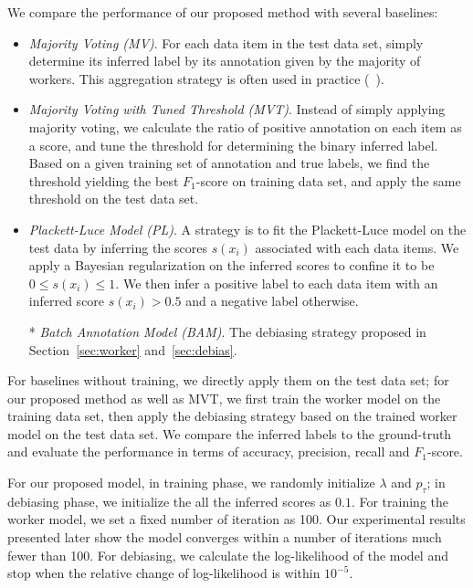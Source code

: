 We compare the performance of our proposed method with several baselines:
\begin{itemize}
  \item \emph{Majority Voting (MV)}.
        For each data item in the test data set, 
        simply determine its inferred label by its annotation given by the majority of workers.  
        This aggregation strategy is often used in practice (\eg~\cite{sheng:kdd2008}).  %
  \item \emph{Majority Voting with Tuned Threshold (MVT)}.
        Instead of simply applying majority voting, 
        we calculate the ratio of positive annotation on each item as a score, 
        and tune the threshold for determining the binary inferred label.  
        Based on a given training set of annotation and true labels, 
        we find the threshold yielding the best $F_1$-score on training data set, 
        and apply the same threshold on the test data set.  
  \item \emph{Plackett-Luce Model (PL)}.  
        A strategy is to fit the Plackett-Luce model on the test data by inferring the scores $s(x_i)$ associated with each data items.  
        We apply a Bayesian regularization on the inferred scores to confine it to be $0 \leq s(x_i) \leq 1$.  
        We then infer a positive label to each data item with an inferred score $s(x_i) > 0.5$ and a negative label otherwise.  
  \item[*] \emph{Batch Annotation Model (BAM)}.  
        The debiasing strategy proposed in Section~\ref{sec:worker} and~\ref{sec:debias}.
\end{itemize}

For baselines without training, we directly apply them on the test data set; 
for our proposed method as well as MVT, we first train the worker model on the training data set, 
then apply the debiasing strategy based on the trained worker model on the test data set.  
We compare the inferred labels to the ground-truth and evaluate the performance in terms of accuracy, precision, recall and $F_1$-score.  

For our proposed model, 
in training phase, we randomly initialize $\lambda$ and $p_{\tau}$;
in debiasing phase, we initialize the all the inferred scores as $0.1$. 
For training the worker model, we set a fixed number of iteration as 100.  
Our experimental results presented later show the model converges within 
a number of iterations much fewer than 100.  
For debiasing, we calculate the log-likelihood of the model and stop when the relative change of log-likelihood is within $10^{-5}$.  


